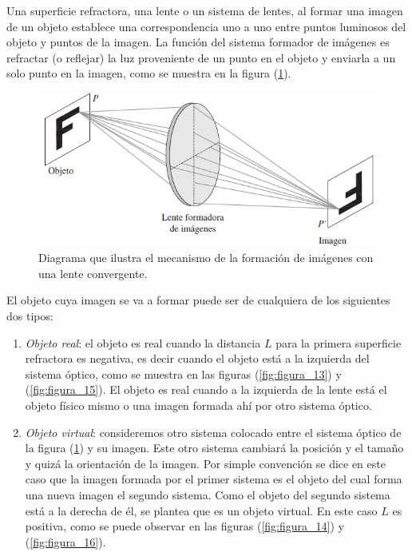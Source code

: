\documentclass[14pt]{extarticle}
\begin{document}
Una superficie refractora, una lente o un sistema de lentes, al formar una imagen de un objeto establece una correspondencia uno a uno entre puntos luminosos del objeto y puntos de la imagen. La función del sistema formador de imágenes es refractar (o reflejar) la luz proveniente de un punto en el objeto y enviarla a un solo punto en la imagen, como se muestra en la figura (\ref{fig:figura_12}).
\begin{figure}[H]
    \centering
    \includegraphics[scale=0.75]{Imagenes/Optica_Geometrica_08.png}
    \caption{Diagrama que ilustra el mecanismo de la formación de imágenes con una lente convergente.}
    \label{fig:figura_12}
\end{figure}
El objeto cuya imagen se va a formar puede ser de cualquiera de los siguientes dos tipos:
\begin{enumerate}[label=\alph*)]
\item \textit{Objeto real}: el objeto es real cuando la distancia $L$ para la primera superficie refractora es negativa, es decir cuando el objeto está a la izquierda del sistema óptico, como se muestra en las figuras (\ref{fig:figura_13})  y (\ref{fig:figura_15}). El objeto es real cuando a la izquierda de la lente está el objeto físico mismo o una imagen formada ahí por otro sistema óptico.
\item \textit{Objeto virtual}: consideremos otro sistema colocado entre el sistema óptico de la figura (\ref{fig:figura_12}) y su imagen. Este otro sistema cambiará la posición y el tamaño y quizá la orientación de la imagen. Por simple convención se dice en este caso que la imagen formada por el primer sistema es el objeto del cual forma una nueva imagen el segundo sistema. Como el objeto del segundo sistema está a la derecha de él, se plantea que es un objeto virtual. En este caso $L$ es positiva, como se puede observar en las figuras (\ref{fig:figura_14}) y (\ref{fig:figura_16}).
\end{enumerate}
\end{document}
